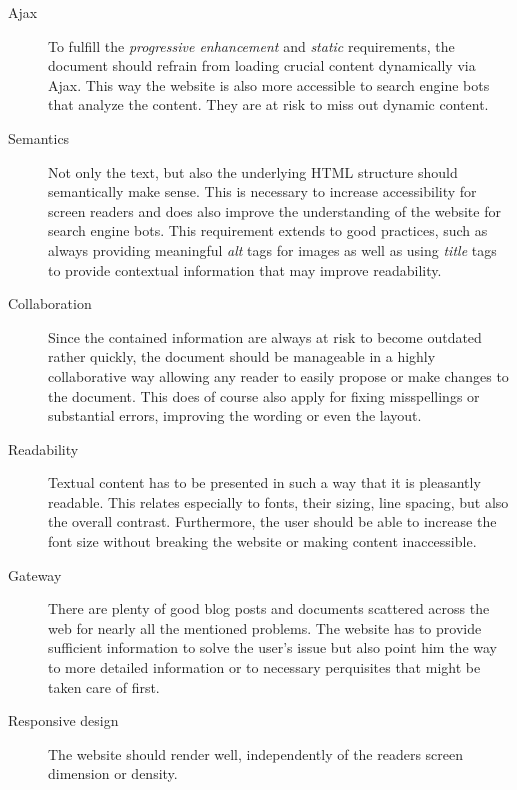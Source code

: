 \begin{description}
	\item[Ajax]\hfill

	To fulfill the \textit{progressive enhancement} and \textit{static} requirements, the document should refrain from loading crucial content dynamically via \ac{Ajax}. This way the website is also more accessible to search engine bots that analyze the content. They are at risk to miss out dynamic content.

	\item[Semantics]\hfill

	Not only the text, but also the underlying \ac{HTML} structure should semantically make sense. This is necessary to increase accessibility for screen readers and does also improve the understanding of the website for search engine bots. This requirement extends to good practices, such as always providing meaningful \textit{alt} tags for images as well as using \textit{title} tags to provide contextual information that may improve readability.

	\item[Collaboration]\hfill

	Since the contained information are always at risk to become outdated rather quickly, the document should be manageable in a highly collaborative way allowing any reader to easily propose or make changes to the document. This does of course also apply for fixing misspellings or substantial errors, improving the wording or even the layout.

	\item[Readability]\hfill

	Textual content has to be presented in such a way that it is pleasantly readable. This relates especially to fonts, their sizing, line spacing, but also the overall contrast. Furthermore, the user should be able to increase the font size without breaking the website or making content inaccessible.

	\item[Gateway]\hfill

	There are plenty of good blog posts and documents scattered across the web for nearly all the mentioned problems. The website has to provide sufficient information to solve the user's issue but also point him the way to more detailed information or to necessary perquisites that might be taken care of first.

	\item[Responsive design]\hfill

	The website should render well, independently of the readers screen dimension or density.


\end{description}
